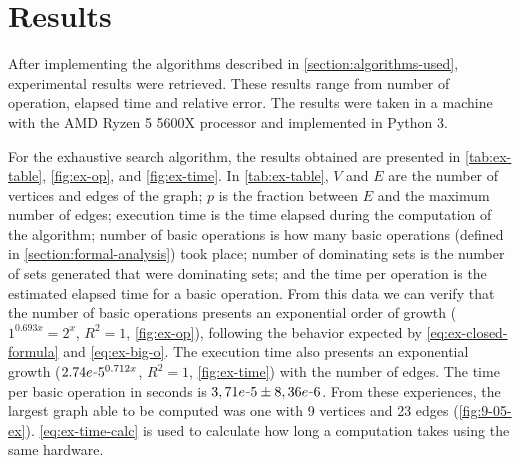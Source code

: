 \section{Results}\label{section:results}
After implementing the algorithms described in \autoref{section:algorithms-used}, experimental results were retrieved.
These results range from number of operation, elapsed time and relative error.
The results were taken in a machine with the AMD Ryzen 5 5600X processor and implemented in Python 3.

For the exhaustive search algorithm, the results obtained are presented in \autoref{tab:ex-table}, \autoref{fig:ex-op}, and \autoref{fig:ex-time}.
In \autoref{tab:ex-table}, $V$ and $E$ are the number of vertices and edges of the graph; $p$ is the fraction between $E$ and the maximum number of edges; execution time is the time elapsed during the computation of the algorithm;
number of basic operations is how many basic operations (defined in \autoref{section:formal-analysis}) took place; number of dominating sets is the number of sets generated that were dominating sets; and the time per operation is the estimated elapsed time for a basic operation.
From this data we can verify that the number of basic operations presents an exponential order of growth ($1^{0.693x}=2^x$, $R^2=1$, \autoref{fig:ex-op}), following the behavior expected by \autoref{eq:ex-closed-formula} and \autoref{eq:ex-big-o}.
The execution time also presents an exponential growth ($2.74e\scalebox{0.5}[1.0]{\( - \)}5^{0.712x}$, $R^2=1$, \autoref{fig:ex-time}) with the number of edges.
The time per basic operation in seconds is $3,71e\scalebox{0.5}[1.0]{\( - \)}5 \pm 8,36e{\scalebox{0.5}[1.0]{\( - \)}6}$.
From these experiences, the largest graph able to be computed was one with 9 vertices and 23 edges (\autoref{fig:9-05-ex}).
\autoref{eq:ex-time-calc} is used to calculate how long a computation takes using the same hardware.


